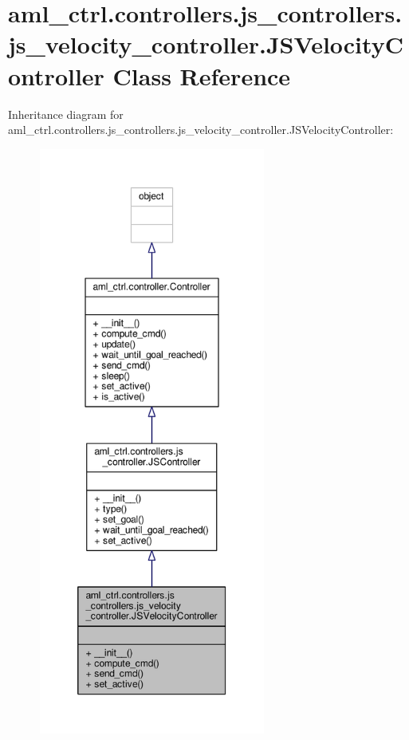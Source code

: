 \hypertarget{classaml__ctrl_1_1controllers_1_1js__controllers_1_1js__velocity__controller_1_1_j_s_velocity_controller}{\section{aml\-\_\-ctrl.\-controllers.\-js\-\_\-controllers.\-js\-\_\-velocity\-\_\-controller.\-J\-S\-Velocity\-Controller Class Reference}
\label{classaml__ctrl_1_1controllers_1_1js__controllers_1_1js__velocity__controller_1_1_j_s_velocity_controller}
}


Inheritance diagram for aml\-\_\-ctrl.\-controllers.\-js\-\_\-controllers.\-js\-\_\-velocity\-\_\-controller.\-J\-S\-Velocity\-Controller\-:
\nopagebreak
\begin{figure}[H]
\begin{center}
\leavevmode
\includegraphics[height=550pt]{classaml__ctrl_1_1controllers_1_1js__controllers_1_1js__velocity__controller_1_1_j_s_velocity_controller__inherit__graph}
\end{center}
\end{figure}



